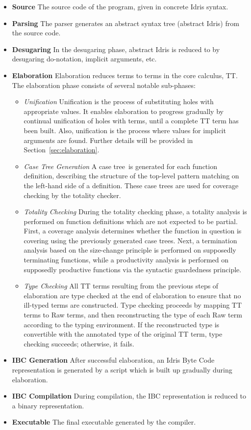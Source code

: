\begin{itemize}
\item \textbf{Source}
The source code of the program, given in concrete Idris syntax.
\item \textbf{Parsing}
The parser generates an abstract syntax tree (abstract Idris) from the source code.
\item \textbf{Desugaring}
 In the desugaring phase, abstract Idris is reduced to \IdrisM{} by
 desugaring do-notation, implicit arguments, etc.
\item \textbf{Elaboration}
Elaboration reduces \IdrisM{} terms to terms in the core calculus, TT. The
elaboration phase consists of several notable sub-phases:
\begin{itemize}
\item \textit{Unification}
Unification is the process of substituting holes with appropriate values. It
enables elaboration to progress gradually by continual unification of holes with
terms, until a complete TT term has been built. Also, unification is the process
where values for implicit arguments are found. Further details will be provided
in Section~\ref{sec:elaboration}.
\item \textit{Case Tree Generation}
A case tree\,\citep{Augustsson:1985} is generated for each function definition,
describing the structure of the top-level pattern matching on the left-hand side
of a definition. These case trees are
used for coverage checking by the totality checker.
\item \textit{Totality Checking} During the totality checking phase, a totality
  analysis is performed on function definitions which are not expected to be
  partial. First, a coverage analysis determines whether the function in
  question is covering using the previously generated case trees. Next, a
  termination analysis based on the size-change principle is performed on
  supposedly terminating functions, while a productivity analysis is performed
  on supposedly productive functions via the syntactic guardedness principle.
\item \textit{Type Checking} All TT terms resulting from the previous steps of
  elaboration are type checked at the end of elaboration to ensure that no
  ill-typed terms are constructed. Type checking proceeds by mapping TT terms
  to Raw terms, and then reconstructing the type of each Raw term according to
  the typing environment. If the reconstructed type is convertible with the
  annotated type of the original TT term, type checking succeeds; otherwise, it
  fails.
\end{itemize}
\item \textbf{IBC Generation}
After successful elaboration, an Idris Byte Code representation is
generated by a script which is built up gradually during elaboration. 
\item \textbf{IBC Compilation}
During compilation, the IBC representation is reduced to a binary
representation.
\item \textbf{Executable}
The final executable generated by the compiler.
\end{itemize}

